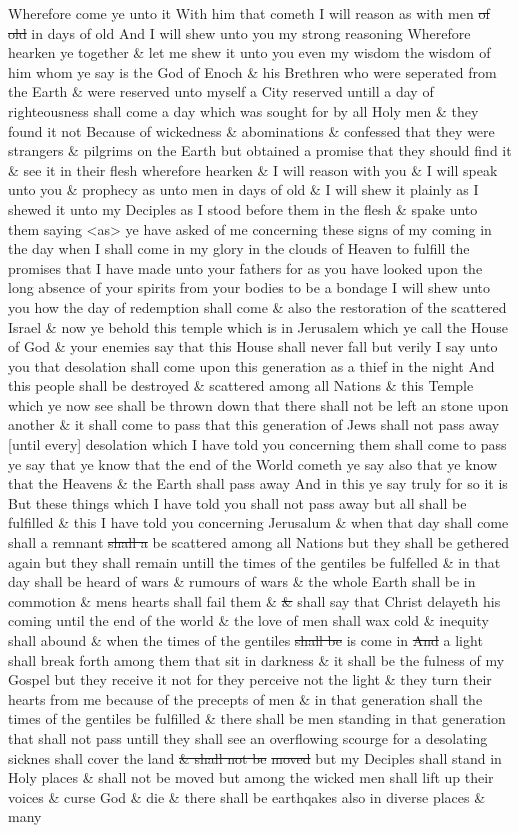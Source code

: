 				Wherefore come ye unto it With him that cometh I will reason as with men \sout{of old} in days of old And I will shew unto you my strong reasoning Wherefore hearken ye together \& let me shew it unto you even my wisdom the wisdom of him whom ye say is the God of Enoch \& his Brethren who were seperated from the Earth \& were reserved unto myself a City reserved untill a day of righteousness shall come a day which was sought for by all Holy men \& they found it not Because of wickedness \& abominations \& confessed that they were strangers \& pilgrims on the Earth but obtained a promise that they should find it \& see it in their flesh wherefore hearken \& I will reason with you \& I will speak unto you \& prophecy as unto men in days of old \& I will shew it plainly as I shewed it unto my Deciples as I stood before them in the flesh \& spake unto them saying <as> ye have asked of me concerning these signs of my coming in the day when I shall come in my glory in the clouds of Heaven to fulfill the promises that I have made unto your fathers for as you have looked upon the long absence of your spirits from your bodies to be a bondage I will shew unto you how the day of redemption shall come \& also the restoration of the scattered Israel \& now ye behold this temple which is in Jerusalem which ye call the House of God \& your enemies say that this House shall never fall but verily I say unto you that desolation shall come upon this generation as a thief in the night And this people shall be destroyed \& scattered among all Nations \& this Temple which ye now see shall be thrown down that there shall not be left an stone upon another \& it shall come to pass that this generation of Jews shall not pass away [until every] desolation which I have told you concerning them shall come to pass ye say that ye know that the end of the World cometh ye say also that ye know that the Heavens \& the Earth shall pass away And in this ye say truly for so it is But these things which I have told you shall not pass away but all shall be fulfilled \& this I have told you concerning Jerusalum \& when that day shall come shall a remnant \sout{shall a} be scattered among all Nations but they shall be gethered again but they shall remain untill the times of the gentiles be fulfelled \& in that day shall be heard of wars \& rumours of wars \& the whole Earth shall be in commotion \& mens hearts shall fail them \& \sout{\&} shall say that Christ delayeth his coming until the end of the world \& the love of men shall wax cold \& inequity shall abound \& when the times of the gentiles \sout{shall be} is come in \sout{And} a light shall break forth among them that sit in darkness \& it shall be the fulness of my Gospel but they receive it not for they perceive not the light \& they turn their hearts from me because of the precepts of men \& in that generation shall the times of the gentiles be fulfilled \& there shall be men standing in that generation that shall not pass untill they shall see an overflowing scourge for a desolating sicknes shall cover the land \sout{\& shall not be} \sout{moved} but my Deciples shall stand in Holy places \& shall not be moved but among the wicked men shall lift up their voices \& curse God \& die \& there shall be earthqakes also in diverse places \& many 